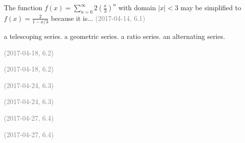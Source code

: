 \documentclass[12pt]{exam}
\newcommand{\questionDate}[1]{\textcolor{gray}{(#1)}}
\newcommand{\<}{\langle}
\renewcommand{\>}{\rangle}
\begin{document}
\begin{questions}
\question
The function \(f(x)=\sum_{n=0}^\infty2(\frac{x}{3})^n\) with domain
\(|x|<3\) may be simplified to \(f(x)=\frac{2}{1-x/3}\)  because it is...
\questionDate{2017-04-14, 6.1}
\begin{choices}
\choice
  a telescoping series.
\CorrectChoice
  a geometric series.
\choice
  a ratio series.
\choice
  an alternating series.
\end{choices}


\newpage

\question

\questionDate{2017-04-18, 6.2}
\begin{choices}
\choice

\choice

\CorrectChoice

\choice

\end{choices}

\question

\questionDate{2017-04-18, 6.2}
\begin{choices}
\choice

\CorrectChoice

\choice

\choice

\end{choices}


\newpage

\question

\questionDate{2017-04-24, 6.3}
\begin{choices}
\choice

\choice

\CorrectChoice

\choice

\end{choices}

\question

\questionDate{2017-04-24, 6.3}
\begin{choices}
\choice

\CorrectChoice

\choice

\choice

\end{choices}


\newpage

\question

\questionDate{2017-04-27, 6.4}
\begin{choices}
\choice

\CorrectChoice

\choice

\choice

\end{choices}

\question

\questionDate{2017-04-27, 6.4}
\begin{choices}
\choice

\choice

\choice

\CorrectChoice

\end{choices}


\end{questions}
\end{document}
